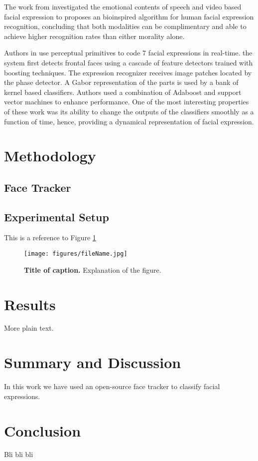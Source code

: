 \documentclass[]{article}
\begin{document}
The work from \cite{Chen670976} investigated the emotional contents of speech and video based facial expression to
proposes an bioinspired algorithm for human facial expression recognition, concluding that both modalities can be
complimentary and able to achieve higher recognition rates than either morality alone.


Authors in \cite{Bartlett4624313} use perceptual primitives to code 7 facial expressions in real-time. the system first
detects frontal faces using a cascade of feature detectors trained with boosting techniques. The expression recognizer
receives image patches located by the phase detector. A Gabor representation of the parts is used  by a bank of kernel
based classifiers. Authors used a combination of Adaboost and support vector machines to enhance performance. One of the
most interesting properties of these work was its ability to change the outputs of the classifiers smoothly as a
function of time, hence, providing a dynamical representation of facial expression.






\section{Methodology}
\subsection{Face Tracker}

\subsection{Experimental Setup}
This is a reference to Figure \ref{figureLabel}

\begin{figure}[ht]
\begin{center}
\vspace{-3mm}
\texttt{[image: figures/fileName.jpg]}
\end{center}
\caption{\textbf{Title of caption.} Explanation of the figure.}
\label{figureLabel}
\end{figure}


\section{Results}
More plain text.

\section{Summary and Discussion}
In this work we have used an open-source face tracker to classify facial expressions.

\section{Conclusion}
Bli bli bli



\end{document}
